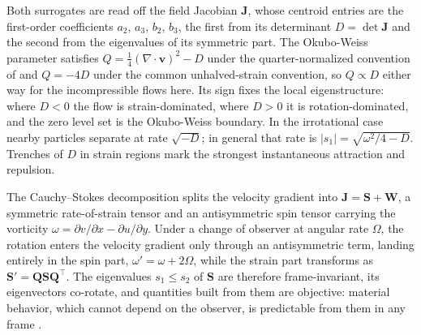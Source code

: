 \documentclass[lettersize,journal]{IEEEtran}
\begin{document}
Both surrogates are read off the field Jacobian $\mathbf{J}$, whose
centroid entries are the first-order coefficients $a_2$, $a_3$, $b_2$,
$b_3$, the first from its determinant $D = \det \mathbf{J}$ and the
second from the eigenvalues of its symmetric part. The Okubo-Weiss
parameter \cite{21,22} satisfies $Q = \tfrac{1}{4} (\nabla \cdot
\mathbf{v})^2 - D$ under the quarter-normalized convention of
\cite{24} and $Q = -4D$ under the common unhalved-strain convention, so
$Q \propto D$ either way for the incompressible flows here. Its sign
fixes the local eigenstructure: where $D < 0$ the
flow is strain-dominated, where $D > 0$ it is rotation-dominated, and
the zero level set is the Okubo-Weiss boundary. In the irrotational
case nearby particles separate at rate $\sqrt{-D}$; in general that
rate is $\lvert s_1 \rvert = \sqrt{\omega^2/4 - D}$.
Trenches of $D$ in strain regions mark the strongest instantaneous attraction and repulsion.

The Cauchy--Stokes decomposition splits the velocity gradient into
$\mathbf{J} = \mathbf{S} + \mathbf{W}$, a symmetric rate-of-strain
tensor and an antisymmetric spin tensor carrying the vorticity $\omega
= \partial v/\partial x - \partial u/\partial y$. Under a change of
observer at angular rate $\Omega$, the rotation enters the
velocity gradient only through an antisymmetric term, landing
entirely in the spin part, $\omega' = \omega + 2\Omega$, while the
strain part transforms as $\mathbf{S}' = \mathbf{Q}\mathbf{S}
\mathbf{Q}^\top$. The eigenvalues $s_1 \leq s_2$ of $\mathbf{S}$ are
therefore frame-invariant, its eigenvectors co-rotate, and quantities
built from them are objective: material behavior, which cannot depend
on the observer, is predictable from them in any frame \cite{16,17}.
\end{document}
